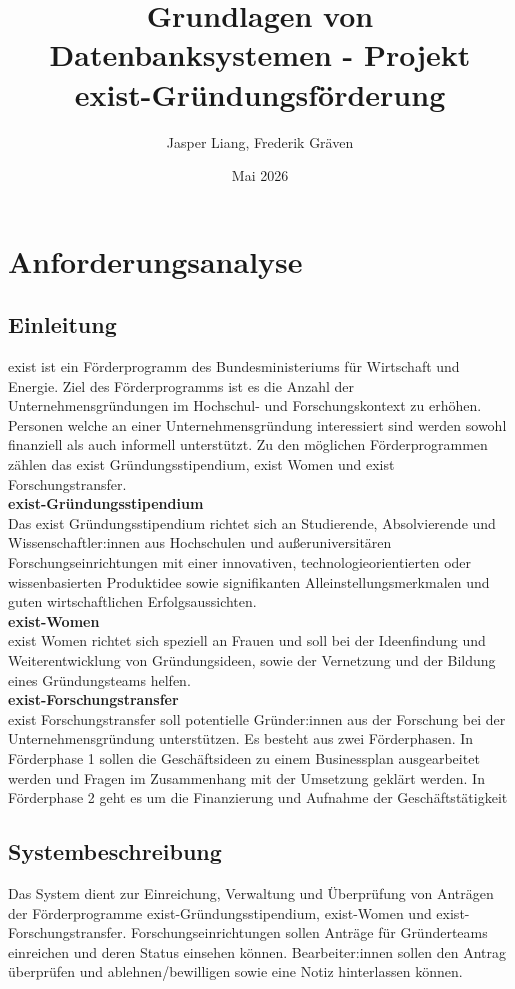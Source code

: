 \documentclass{article}
\title{Grundlagen von Datenbanksystemen - Projekt exist-Gründungsförderung}
\author{Jasper Liang, Frederik Gräven}
\date{Mai 2026}
\begin{document}
\maketitle
\newpage
\tableofcontents
\newpage
\section{Anforderungsanalyse}
\subsection{Einleitung}
exist ist ein Förderprogramm des Bundesministeriums für Wirtschaft und Energie. Ziel des Förderprogramms ist es die Anzahl der Unternehmensgründungen im Hochschul- und Forschungskontext zu erhöhen. Personen welche an einer Unternehmensgründung interessiert sind werden sowohl finanziell als auch informell unterstützt. Zu den möglichen Förderprogrammen zählen das exist Gründungsstipendium, exist Women und exist Forschungstransfer. \\
\textbf{exist-Gründungsstipendium} \\
Das exist Gründungsstipendium richtet sich an Studierende, Absolvierende und Wissenschaftler:innen aus Hochschulen und außeruniversitären Forschungseinrichtungen mit einer innovativen, technologieorientierten oder wissenbasierten Produktidee sowie signifikanten Alleinstellungsmerkmalen und guten wirtschaftlichen Erfolgsaussichten.\\
\textbf{exist-Women}\\
exist Women richtet sich speziell an Frauen und soll bei der Ideenfindung und Weiterentwicklung von Gründungsideen, sowie der Vernetzung und der Bildung eines Gründungsteams helfen. \\
\textbf{exist-Forschungstransfer}\\
exist Forschungstransfer soll potentielle Gründer:innen aus der Forschung bei der Unternehmensgründung unterstützen. Es besteht aus zwei Förderphasen. In Förderphase 1 sollen die Geschäftsideen zu einem Businessplan ausgearbeitet werden und Fragen im Zusammenhang mit der Umsetzung geklärt werden.
In Förderphase 2 geht es um die Finanzierung und Aufnahme der Geschäftstätigkeit

\subsection{Systembeschreibung}
Das System dient zur Einreichung, Verwaltung und Überprüfung von Anträgen der Förderprogramme exist-Gründungsstipendium, exist-Women und exist-Forschungstransfer. Forschungseinrichtungen sollen Anträge für Gründerteams einreichen und deren Status einsehen können. Bearbeiter:innen sollen den Antrag überprüfen und ablehnen/bewilligen sowie eine Notiz hinterlassen können.
\end{document}
